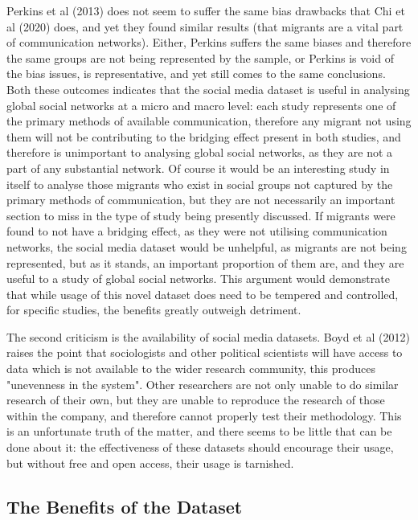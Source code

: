 \documentclass[12pt]{article}
\begin{document}
Perkins et al (2013) does not seem to suffer the same bias drawbacks that Chi et al (2020) does, 
and yet they found similar results (that migrants are a vital part of communication 
networks). Either, Perkins suffers the same biases and therefore the same groups are not 
being represented by the sample, or Perkins is void of the bias issues, is representative, 
and yet still comes to the same conclusions. Both these outcomes indicates that the social 
media dataset is useful in analysing global social networks at a micro and macro level: 
each study represents one of the primary methods of available communication, therefore 
any migrant not using them will not be contributing to the bridging effect present in 
both studies, and therefore is unimportant to analysing global social networks, as they are 
not a part of any substantial network. Of course it would be an interesting study in 
itself to analyse those migrants who exist in social groups not captured by the primary 
methods of communication, but they are not necessarily an important section to miss in the 
type of study being presently discussed. If migrants were found to not have a bridging 
effect, as they were not utilising communication networks, the social media dataset would 
be unhelpful, as migrants are not being represented, but as it stands, an important 
proportion of them are, and they are useful to a study of global social networks. This 
argument would demonstrate that while usage of this novel dataset does need to be 
tempered and controlled, for specific studies, the benefits greatly outweigh detriment. 

The second criticism is the availability of social media datasets. Boyd et al (2012) 
raises the point that sociologists and other political scientists will have access 
to data which is not available to the wider research community, this produces "unevenness 
in the system". Other researchers are not only unable to do similar research of their own, 
but they are unable to reproduce the research of those within the company, and therefore 
cannot properly test their methodology. This is an unfortunate truth of the matter, and 
there seems to be little that can be done about it: the effectiveness of these datasets 
should encourage their usage, but without free and open access, their usage is tarnished.

\subsection{The Benefits of the Dataset}
\end{document}
